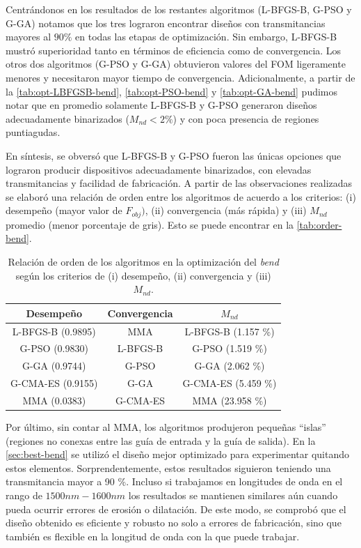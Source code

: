 Centrándonos en los resultados de los restantes algoritmos (L-BFGS-B, G-PSO y G-GA)
notamos que los tres lograron encontrar diseños con transmitancias mayores al $90 \%$
en todas las etapas de optimización. Sin embargo, L-BFGS-B mustró superioridad 
tanto en términos de eficiencia como de convergencia. Los otros dos algoritmos (G-PSO y G-GA)
obtuvieron valores del FOM ligeramente menores y necesitaron mayor tiempo de convergencia.
Adicionalmente, a partir de la \autoref{tab:opt-LBFGSB-bend}, \autoref{tab:opt-PSO-bend} y
\autoref{tab:opt-GA-bend} pudimos notar que en promedio solamente L-BFGS-B y G-PSO
generaron diseños adecuadamente binarizados ($M_{nd} < 2 \%$) y con poca presencia de regiones
puntiagudas.

En síntesis, se obversó que L-BFGS-B y G-PSO fueron las únicas opciones que lograron
producir dispositivos adecuadamente binarizados, con elevadas transmitancias y 
facilidad de fabricación.
A partir de las observaciones realizadas se elaboró una relación de orden entre los 
algoritmos de acuerdo a los criterios: 
(i) desempeño (mayor valor de $F_{obj})$, 
(ii) convergencia (más rápida) y 
(iii) $M_{nd}$ promedio (menor porcentaje de gris).
Esto se puede encontrar en la \autoref{tab:order-bend}.

\begin{table}[ht]
    \centering
    \begin{tabular}{|c|c|c|}
    \hline 
    Desempeño &  Convergencia & $M_{nd} $\\
    \hline 
    L-BFGS-B (0.9895) & MMA      &  L-BFGS-B (1.157 \%) \\
    G-PSO (0.9830)    & L-BFGS-B & G-PSO (1.519 \%) \\
    G-GA (0.9744)     & G-PSO    & G-GA (2.062 \%) \\
    G-CMA-ES (0.9155) & G-GA     & G-CMA-ES (5.459 \%) \\
    MMA (0.0383)      & G-CMA-ES & MMA (23.958 \%) \\
    \hline 
    \end{tabular}
    \caption{Relación de orden de los algoritmos en la optimización del \emph{bend} según
             los criterios de (i) desempeño, (ii) convergencia y (iii) $M_{nd}$.}
    \label{tab:order-bend}
\end{table}


Por último, sin contar al MMA, los algoritmos produjeron pequeñas ``islas''
(regiones no conexas entre las guía de entrada y la guía de salida).
En la \autoref{sec:best-bend} se utilizó el diseño mejor optimizado para experimentar
quitando estos elementos. 
Sorprendentemente, estos resultados siguieron teniendo una transmitancia
mayor a 90 \%.
Incluso si trabajamos en longitudes de onda en el rango de $1500nm-1600nm$
los resultados se mantienen similares aún cuando pueda ocurrir errores de erosión o dilatación.
De este modo, se comprobó que el diseño obtenido es eficiente y robusto no solo a errores
de fabricación, sino que también es flexible en la longitud de onda con la que puede trabajar.

